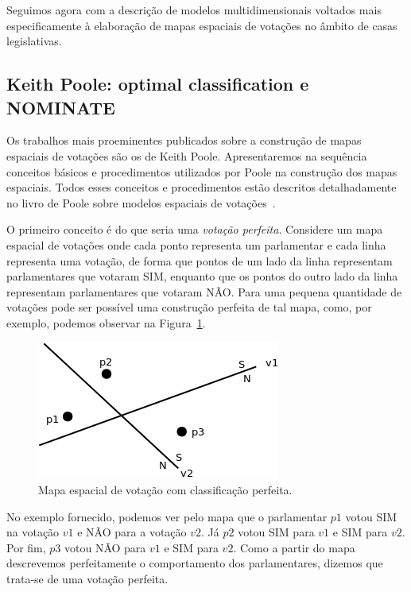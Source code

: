 \documentclass[a4paper, 12pt]{article}
\newcommand\nay{NÃO\xspace}
\newcommand\yea{SIM\xspace}
\newcommand\nominate{NOMINATE\xspace}
\begin{document}
Seguimos agora com a descrição de modelos multidimensionais voltados mais especificamente à elaboração de mapas espaciais de votações no âmbito de casas legislativas.

\subsection{Keith Poole: optimal classification e \nominate}

Os trabalhos mais proeminentes publicados sobre a construção de mapas espaciais de votações são os de Keith Poole. Apresentaremos na sequência conceitos básicos e procedimentos utilizados por Poole na construção dos mapas espaciais. Todos esses conceitos e procedimentos estão descritos detalhadamente no livro de Poole sobre modelos espaciais de votações~\cite{poole2005book}.

O primeiro conceito é do que seria uma \emph{votação perfeita}. Considere um mapa espacial de votações onde cada ponto representa um parlamentar e cada linha representa uma votação, de forma que pontos de um lado da linha representam parlamentares que votaram \yea, enquanto que os pontos do outro lado da linha representam parlamentares que votaram \nay. Para uma pequena quantidade de votações pode ser possível uma construção perfeita de tal mapa, como, por exemplo, podemos observar na Figura~\ref{fig:mapa-classificacao-perfeita}.

\begin{figure}[h]
  \centering
  \includegraphics[scale=0.7]{figs/votacao-perfeita.png}
  \caption{Mapa espacial de votação com classificação perfeita.}
  \label{fig:mapa-classificacao-perfeita}
\end{figure}

No exemplo fornecido, podemos ver pelo mapa que o parlamentar $p1$ votou \yea na votação $v1$ e \nay para a votação $v2$. Já $p2$ votou \yea para $v1$ e \yea para $v2$. Por fim, $p3$ votou \nay para $v1$ e \yea para $v2$. Como a partir do mapa descrevemos perfeitamente o comportamento dos parlamentares, dizemos que trata-se de uma votação perfeita.
\end{document}
